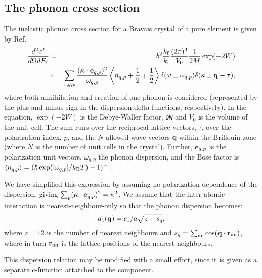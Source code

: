 \subsection{The phonon cross section} %
The inelastic phonon cross section for a Bravais crystal of a pure element
is given by Ref.~\cite[ch.3~]{squires} 
\begin{eqnarray}
\frac{d^2\sigma'}{d\Omega dE_{\rm f}} &=&
  b^2 \frac{k_{\rm f}}{k_{\rm i}} \frac{(2\pi)^3}{V_0}\frac{1}{2M} \exp(-2W) \nonumber \\
&\times&
  \sum_{\tau,q,p} \frac{(\mbox{\boldmath $\kappa$} \cdot {\bf e}_{q,p})^2}
                       {\omega_{q,p}} 
  \left\langle n_{q,p} + \frac{1}{2} \mp \frac{1}{2} \right\rangle
  \delta(\omega\pm\omega_{q,p}) \delta(\kappa\pm{\bf q}-\tau) ,
\end{eqnarray}
where both annihilation and creation of one phonon is considered
(represented by the plus and minus sign in the dispersion delta functions,
respectively).
In the equation, 
$\exp(-2W)$ is the Debye-Waller factor, \verb+DW+ and
$V_0 $ is the volume of the unit cell.
The sum runs over the reciprocal lattice vectors, $\tau$, 
over the polarisation index, $p$,
and the $N$ allowed wave vectors {\bf q} within the Brillouin zone
(where $N$ is the number of unit cells in the crystal).
Further, ${\bf e}_{q,p}$ is the
polarization unit vectors, $\omega_{q,p}$ the phonon dispersion,
and the Bose factor is 
$\langle n_{q,p} \rangle = (\hbar \exp(|\omega_{q,p}|/k_{\rm B}T)-1)^{-1}$.

We have simplified this expression by assuming no polarization
dependence of the dispersion, giving 
$\sum_{p} (\mbox{\boldmath $\kappa$} \cdot {\bf e}_{q,p})^2 = \kappa^2$.
We assume that the inter-atomic interaction is nearest-neighbour-only
so that the phonon dispersion becomes: 
\begin{equation}
d_1({\bf q}) = c_1/a \sqrt{z-s_q} ,
\end{equation}
where $z=12$ is the number of nearest neighbours and 
$s_q=\sum_{\rm nn} \cos({\bf q} \cdot {\bf r}_{\rm nn})$,
where in turn ${\bf r}_{\rm nn}$ is the lattice positions of the 
nearest neighbours.

This dispersion relation may be modified with a small effort,
since it is given as a separate c-function attatched to the component.

